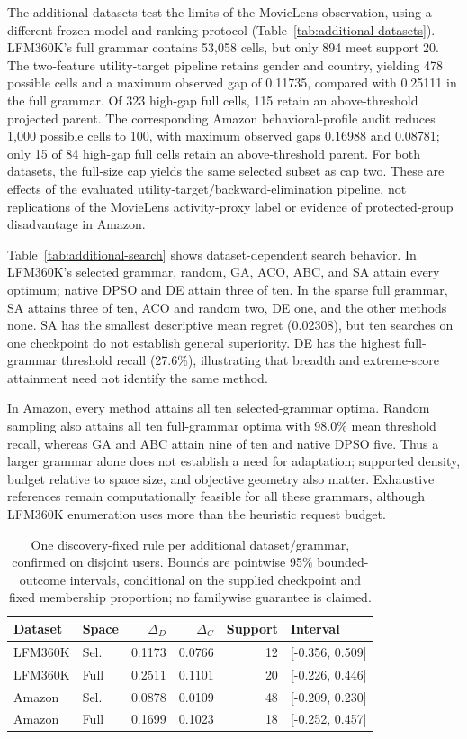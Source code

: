 \documentclass[sigconf,nonacm]{acmart}
\begin{document}
The additional datasets test the limits of the MovieLens observation, using a different frozen model and ranking protocol (Table~\ref{tab:additional-datasets}). LFM360K's full grammar contains 53,058 cells, but only 894 meet support 20. The two-feature utility-target pipeline retains gender and country, yielding 478 possible cells and a maximum observed gap of 0.11735, compared with 0.25111 in the full grammar. Of 323 high-gap full cells, 115 retain an above-threshold projected parent. The corresponding Amazon behavioral-profile audit reduces 1,000 possible cells to 100, with maximum observed gaps 0.16988 and 0.08781; only 15 of 84 high-gap full cells retain an above-threshold parent. For both datasets, the full-size cap yields the same selected subset as cap two. These are effects of the evaluated utility-target/backward-elimination pipeline, not replications of the MovieLens activity-proxy label or evidence of protected-group disadvantage in Amazon.

Table~\ref{tab:additional-search} shows dataset-dependent search behavior. In LFM360K's selected grammar, random, GA, ACO, ABC, and SA attain every optimum; native DPSO and DE attain three of ten. In the sparse full grammar, SA attains three of ten, ACO and random two, DE one, and the other methods none. SA has the smallest descriptive mean regret (0.02308), but ten searches on one checkpoint do not establish general superiority. DE has the highest full-grammar threshold recall (27.6\%), illustrating that breadth and extreme-score attainment need not identify the same method.

In Amazon, every method attains all ten selected-grammar optima. Random sampling also attains all ten full-grammar optima with 98.0\% mean threshold recall, whereas GA and ABC attain nine of ten and native DPSO five. Thus a larger grammar alone does not establish a need for adaptation; supported density, budget relative to space size, and objective geometry also matter. Exhaustive references remain computationally feasible for all these grammars, although LFM360K enumeration uses more than the heuristic request budget.

\begin{table}[t]
\centering
\caption{One discovery-fixed rule per additional dataset/grammar, confirmed on disjoint users. Bounds are pointwise 95\% bounded-outcome intervals, conditional on the supplied checkpoint and fixed membership proportion; no familywise guarantee is claimed.}
\label{tab:additional-confirmation}
\small
\begin{tabular}{llrrrl}
\toprule
Dataset & Space & $\Delta_D$ & $\Delta_C$ & Support & Interval \\
\midrule
LFM360K & Sel. & 0.1173 & 0.0766 & 12 & [-0.356, 0.509] \\
LFM360K & Full & 0.2511 & 0.1101 & 20 & [-0.226, 0.446] \\
Amazon & Sel. & 0.0878 & 0.0109 & 48 & [-0.209, 0.230] \\
Amazon & Full & 0.1699 & 0.1023 & 18 & [-0.252, 0.457] \\
\bottomrule
\end{tabular}
\end{table}
\end{document}
